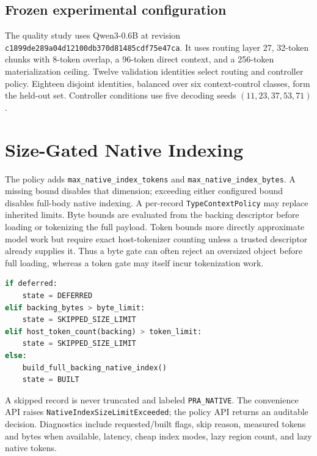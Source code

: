 \documentclass[11pt]{article}
\begin{document}
\subsection{Frozen experimental configuration}

The quality study uses Qwen3-0.6B at revision
\texttt{c1899de289a04d12100db370d81485cdf75e47ca}. It uses routing layer 27,
32-token chunks with 8-token overlap, a 96-token direct context, and a
256-token materialization ceiling. Twelve validation identities select routing
and controller policy. Eighteen disjoint identities, balanced over six
context-control classes, form the held-out set. Controller conditions use five
decoding seeds $(11,23,37,53,71)$.

\section{Size-Gated Native Indexing}

The policy adds \texttt{max\_native\_index\_tokens} and
\texttt{max\_native\_index\_bytes}. A missing bound disables that dimension;
exceeding either configured bound disables full-body native indexing. A
per-record \texttt{TypeContextPolicy} may replace inherited limits. Byte bounds
are evaluated from the backing descriptor before loading or tokenizing the
full payload. Token bounds more directly approximate model work but require
exact host-tokenizer counting unless a trusted descriptor already supplies it.
Thus a byte gate can often reject an oversized object before full loading,
whereas a token gate may itself incur tokenization work.

\begin{lstlisting}[language=Python]
if deferred:
    state = DEFERRED
elif backing_bytes > byte_limit:
    state = SKIPPED_SIZE_LIMIT
elif host_token_count(backing) > token_limit:
    state = SKIPPED_SIZE_LIMIT
else:
    build_full_backing_native_index()
    state = BUILT
\end{lstlisting}

A skipped record is never truncated and labeled \texttt{PRA\_NATIVE}. The
convenience API raises \texttt{NativeIndexSizeLimitExceeded}; the policy API
returns an auditable decision. Diagnostics include requested/built flags, skip
reason, measured tokens and bytes when available, latency, cheap index modes,
lazy region count, and lazy native tokens.
\end{document}

